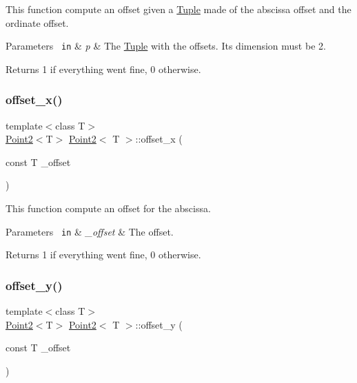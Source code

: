 This function compute an offset given a {\ttfamily \mbox{\hyperlink{class_tuple}{Tuple}}} made of the abscissa offset and the ordinate offset. 


\begin{DoxyParams}[1]{Parameters}
\mbox{\texttt{ in}}  & {\em p} & The {\ttfamily \mbox{\hyperlink{class_tuple}{Tuple}}} with the offsets. Its dimension must be 2. \\
\hline
\end{DoxyParams}
\begin{DoxyReturn}{Returns}
1 if everything went fine, 0 otherwise. 
\end{DoxyReturn}
\mbox{\label{class_point2_ae1536c8c7960ddfdf2087a9e12ddfcf9}} 
\subsubsection{\texorpdfstring{offset\_x()}{offset\_x()}}
{\footnotesize\ttfamily template$<$class T$>$ \\
\mbox{\hyperlink{class_point2}{Point2}}$<$T$>$ \mbox{\hyperlink{class_point2}{Point2}}$<$ T $>$\+::offset\+\_\+x (\begin{DoxyParamCaption}\item[{const T}]{\+\_\+offset }\end{DoxyParamCaption})\hspace{0.3cm}{\ttfamily [inline]}}



This function compute an offset for the abscissa. 


\begin{DoxyParams}[1]{Parameters}
\mbox{\texttt{ in}}  & {\em \+\_\+offset} & The offset. \\
\hline
\end{DoxyParams}
\begin{DoxyReturn}{Returns}
1 if everything went fine, 0 otherwise. 
\end{DoxyReturn}
\mbox{\label{class_point2_abfbc8c5842e9876f7b89d18575fe138d}} 
\subsubsection{\texorpdfstring{offset\_y()}{offset\_y()}}
{\footnotesize\ttfamily template$<$class T$>$ \\
\mbox{\hyperlink{class_point2}{Point2}}$<$T$>$ \mbox{\hyperlink{class_point2}{Point2}}$<$ T $>$\+::offset\+\_\+y (\begin{DoxyParamCaption}\item[{const T}]{\+\_\+offset }\end{DoxyParamCaption})\hspace{0.3cm}{\ttfamily [inline]}}



